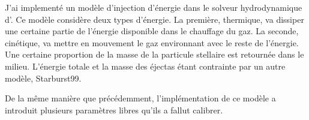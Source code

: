 J'ai implementé un modèle d'injection d'énergie dans le solveur hydrodynamique d'\emma.
Ce modèle considère deux types d'énergie. 
La première, thermique, va dissiper une certaine partie de l'énergie disponible dans le chauffage du gaz.
La seconde, cinétique, va mettre en mouvement le gaz environnant avec le reste de l'énergie.
Une certaine proportion de la masse de la particule stellaire est retournée dans le milieu. 
L'énergie totale et la masse des éjectas étant contrainte par un autre modèle, Starburst99.

De la même manière que précédemment, l'implémentation de ce modèle a introduit plusieurs paramètres libres qu'ils a fallut calibrer.





